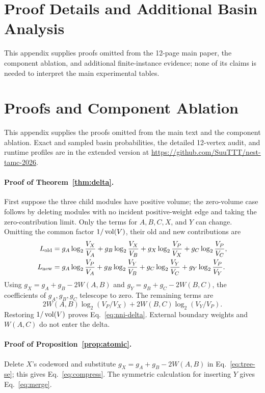 \ifdefined\fullappendix
\section{Proof Details and Additional Basin Analysis}\label{app:proofs}

This appendix supplies proofs omitted from the 12-page main paper, the
component ablation, and additional finite-instance evidence; none of its claims
is needed to interpret the main experimental tables.
\else
\section{Proofs and Component Ablation}\label{app:proofs}

This appendix supplies the proofs omitted from the main text and the component
ablation. Exact and sampled basin probabilities, the detailed 12-vertex audit,
and runtime profiles are in the extended version at
\url{https://github.com/SuuTTT/nest-tamc-2026}.
\fi

\paragraph{Proof of Theorem~\ref{thm:delta}.}
First suppose the three child modules have positive volume; the zero-volume
case follows by deleting modules with no incident positive-weight edge and
taking the zero-contribution limit. Only the terms for $A,B,C,X$, and $Y$ can
change. Omitting the common factor $1/\operatorname{vol}(V)$, their old and new contributions
are
\begin{align*}
 L_{\rm old}={}&g_A\log_2\frac{V_X}{V_A}
 +g_B\log_2\frac{V_X}{V_B}
 +g_X\log_2\frac{V_P}{V_X}
 +g_C\log_2\frac{V_P}{V_C},\\
 L_{\rm new}={}&g_A\log_2\frac{V_P}{V_A}
 +g_B\log_2\frac{V_Y}{V_B}
 +g_C\log_2\frac{V_Y}{V_C}
 +g_Y\log_2\frac{V_P}{V_Y}.
\end{align*}
Using $g_X=g_A+g_B-2W(A,B)$ and
$g_Y=g_B+g_C-2W(B,C)$, the coefficients of $g_A,g_B,g_C$ telescope to zero.
The remaining terms are
\[
 2W(A,B)\log_2(V_P/V_X)+2W(B,C)\log_2(V_Y/V_P).
\]
Restoring $1/\operatorname{vol}(V)$ proves Eq.~\eqref{eq:nni-delta}. External boundary
weights and $W(A,C)$ do not enter the delta.

\paragraph{Proof of Proposition~\ref{prop:atomic}.}
Delete $X$'s codeword and substitute $g_X=g_A+g_B-2W(A,B)$ in
Eq.~\eqref{eq:tree-se}; this gives Eq.~\eqref{eq:compress}. The symmetric
calculation for inserting $Y$ gives Eq.~\eqref{eq:merge}.

